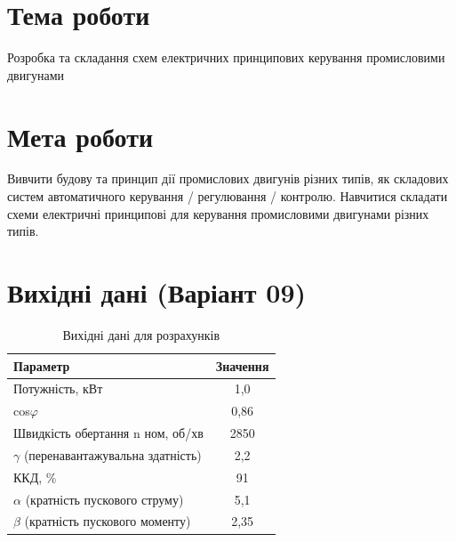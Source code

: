 \documentclass[a4paper]{article}
\begin{document}

    \section*{Тема роботи}
    Розробка та складання схем електричних принципових керування
    промисловими двигунами

    \section*{Мета роботи}
    Вивчити будову та принцип дії промислових двигунів
    різних типів, як складових систем автоматичного
    керування / регулювання / контролю. Навчитися складати схеми електричні
    принципові для керування промисловими двигунами різних типів.

    \section*{Вихідні дані (Варіант 09)}
    \begin{table}[h!]
        \centering
        \begin{tabular}{|l|c|}
            \hline
            \textbf{Параметр} & \textbf{Значення} \\
            \hline
            Потужність, кВт & 1,0 \\
            \hline
            cos$\varphi$ & 0,86 \\
            \hline
            Швидкість обертання n ном, об/хв & 2850 \\
            \hline
            $\gamma$ (перенавантажувальна здатність) & 2,2 \\
            \hline
            ККД, \% & 91 \\
            \hline
            $\alpha$ (кратність пускового струму) & 5,1 \\
            \hline
            $\beta$ (кратність пускового моменту) & 2,35 \\
            \hline
        \end{tabular}
        \caption{Вихідні дані для розрахунків}
    \end{table}

    \newpage 
    
\end{document}
